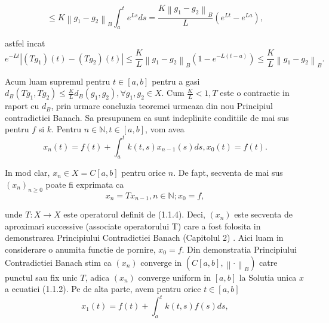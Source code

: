 \documentclass[a4paper,12pt,oneside]{report}
\begin{document}
\begin{displaymath}
  \leq K\left \| g_{1} - g_{2} \right \|_{B} \int_{a}^{t}e^{Ls}ds = \frac{K \left \| g_{1} - g_{2} \right \|_{B}}{L}\left ( e^{Lt} - e^{La}\right ),
\end{displaymath}

 
astfel incat 
\begin{displaymath}
  e^{-Lt}\left | \left ( Tg_{1} \right ) \left ( t \right ) - \left ( Tg_{2} \right )\left ( t \right )\right |\leq \frac{K}{L}\left \| g_{1} - g_{2}\right \|_{B}\left ( 1 - e^{-L\left ( t-a \right )} \right ) \leq  \frac{K}{L}\left \| g_{1}  - g_{2}\right \|_{B}. 
\end{displaymath}

	Acum luam supremul pentru \(t \in \left [ a,b \right ]\) pentru a gasi
\(d_{B}\left ( Tg_{1}, Tg_{2} \right ) \leq \frac{K}{L}d_{B}\left ( g_{1} , g_{2}\right ), \forall g_{1}, g_{2}\in X. \)
	 Cum \(\frac{K}{L} < 1, T\) este o contractie in raport cu \(d_{B}\), prin urmare concluzia teoremei urmeaza din nou Principiul contradictiei Banach. 
	Sa presupunem ca sunt indeplinite conditiile de mai sus pentru \(f\) si \(k\). Pentru \(n\in \mathbb{N}, t\in \left [ a,b \right ]\), vom avea
\begin{displaymath}
  x_{n}\left ( t \right ) = f\left ( t \right ) + \int_{a}^{t}k\left ( t,s \right )x_{n-1}\left ( s \right )ds,
x_{0}\left ( t \right ) = f\left ( t \right ).
\end{displaymath}
 
	In mod clar, \(x_{n} \in X = C\left [ a,b \right ]\) pentru orice \(n\). De fapt, secventa de mai sus \(\left ( x_{n} \right )_{n\geq 0}\) poate fi exprimata ca 
\begin{displaymath}
  x_{n} = Tx_{n-1}, n\in \mathbb{N}; x_{0} = f,
\end{displaymath}

unde \(T : X \rightarrow X\) este operatorul definit de (1.1.4). Deci, \(\left (x_{n}  \right )\) este secventa de aproximari successive (associate operatorului T) care a fost folosita in demonstrarea Principiului Contradictiei Banach (Capitolul 2) . Aici luam in considerare o anumita functie de pornire, \(x_{0} = f\). Din demonstratia Principiului Contradictiei Banach stim ca \(\left ( x_{n} \right )\) converge in \(\left ( C\left [ a,b \right ], \left \| \cdot  \right \|_{B} \right )\) catre punctul sau fix unic \(T\), adica \(\left ( x_{n} \right )\) converge uniform in \(\left [ a,b \right ]\) la Solutia unica \(x\) a ecuatiei (1.1.2). Pe de alta parte, avem pentru orice \(t\in \left [ a,b \right ]\)
\begin{displaymath}
  x_{1}\left ( t \right ) = f\left ( t \right ) + \int_{a}^{t}k\left ( t,s \right )f\left ( s \right )ds,
\end{displaymath}
\end{document}
